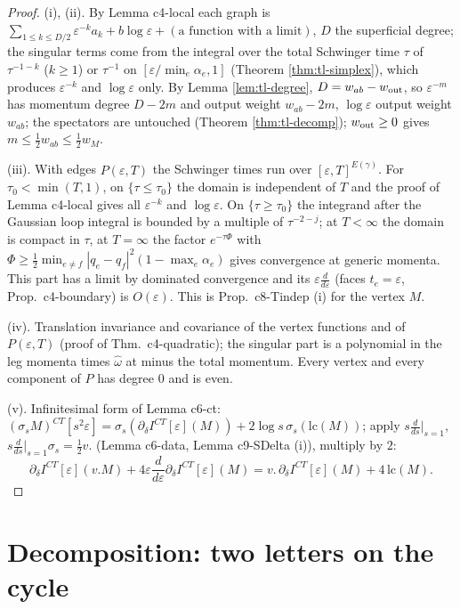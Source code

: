 \documentclass[11pt]{article}
\numberwithin{equation}{section}
\theoremstyle{plain}
\theoremstyle{definition}
\begin{document}
\begin{proof}
(i), (ii). By Lemma c4-local each graph is $\sum_{1\le k\le D/2}\varepsilon^{-k}a_k+b\log\varepsilon+(\text{a function with a limit})$, $D$ the superficial degree; the singular terms come from the integral over the total Schwinger time $\tau$ of $\tau^{-1-k}$ ($k\ge1$) or $\tau^{-1}$ on $[\varepsilon/\min_e\alpha_e,1]$ (Theorem \ref{thm:tl-simplex}), which produces $\varepsilon^{-k}$ and $\log\varepsilon$ only. By Lemma \ref{lem:tl-degree}, $D=w_{ab}-w_{\rm out}$, so $\varepsilon^{-m}$ has momentum degree $D-2m$ and output weight $w_{ab}-2m$, $\log\varepsilon$ output weight $w_{ab}$; the spectators are untouched (Theorem \ref{thm:tl-decomp}); $w_{\rm out}\ge0$ gives $m\le\tfrac12w_{ab}\le\tfrac12w_M$.

(iii). With edges $P(\varepsilon,T)$ the Schwinger times run over $[\varepsilon,T]^{E(\gamma)}$. For $\tau_0<\min(T,1)$, on $\{\tau\le\tau_0\}$ the domain is independent of $T$ and the proof of Lemma c4-local gives all $\varepsilon^{-k}$ and $\log\varepsilon$. On $\{\tau\ge\tau_0\}$ the integrand after the Gaussian loop integral is bounded by a multiple of $\tau^{-2-j}$; at $T<\infty$ the domain is compact in $\tau$, at $T=\infty$ the factor $e^{-\tau\Phi}$ with $\Phi\ge\tfrac12\min_{e\ne f}|q_e-q_f|^2(1-\max_e\alpha_e)$ gives convergence at generic momenta. This part has a limit by dominated convergence and its $\varepsilon\frac{d}{d\varepsilon}$ (faces $t_e=\varepsilon$, Prop.~c4-boundary) is $O(\varepsilon)$. This is Prop.~c8-Tindep (i) for the vertex $M$.

(iv). Translation invariance and covariance of the vertex functions and of $P(\varepsilon,T)$ (proof of Thm.~c4-quadratic); the singular part is a polynomial in the leg momenta times $\hat\omega$ at minus the total momentum. Every vertex and every component of $P$ has degree $0$ and is even.

(v). Infinitesimal form of Lemma c6-ct: $(\sigma_sM)^{CT}[s^2\varepsilon]=\sigma_s(\partial_\delta I^{CT}[\varepsilon](M))+2\log s\,\sigma_s(\mathrm{lc}(M))$; apply $s\frac{d}{ds}|_{s=1}$, $s\frac{d}{ds}|_{s=1}\sigma_s=\tfrac12v.$ (Lemma c6-data, Lemma c9-SDelta (i)), multiply by $2$:
\[
\partial_\delta I^{CT}[\varepsilon](v.M)+4\varepsilon\frac{d}{d\varepsilon}\partial_\delta I^{CT}[\varepsilon](M)=v.\,\partial_\delta I^{CT}[\varepsilon](M)+4\,\mathrm{lc}(M).
\]
\end{proof}


\section{Decomposition: two letters on the cycle}
\label{sec:tl-decomp}
\end{document}

